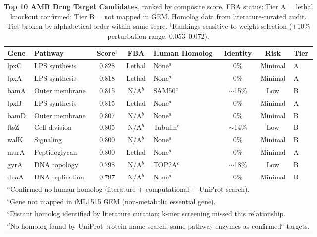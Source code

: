 \documentclass[12pt,a4paper]{article}
\begin{document}
\begin{table}[H]
\centering
\caption{\textbf{Top 10 AMR Drug Target Candidates}, ranked by composite score. FBA status: Tier A = lethal knockout confirmed; Tier B = not mapped in GEM. Homolog data from literature-curated audit. Ties broken by alphabetical order within same score. $^\dagger$Rankings sensitive to weight selection ($\pm$10\% perturbation range: 0.053--0.072).}
\label{tab:targets}
\begin{tabular}{llcclccl}
\toprule
\textbf{Gene} & \textbf{Pathway} & \textbf{Score}$^\dagger$ & \textbf{FBA} & \textbf{Human Homolog} & \textbf{Identity} & \textbf{Risk} & \textbf{Tier} \\
\midrule
lpxC & LPS synthesis & 0.828 & Lethal & None$^a$ & 0\% & Minimal & A \\
lpxA & LPS synthesis & 0.818 & Lethal & None$^d$ & 0\% & Minimal & A \\
bamA & Outer membrane & 0.815 & N/A$^b$ & SAM50$^c$ & $\sim$15\% & Low & B \\
lpxB & LPS synthesis & 0.815 & Lethal & None$^d$ & 0\% & Minimal & A \\
bamD & Outer membrane & 0.807 & N/A$^b$ & None$^d$ & 0\% & Minimal & B \\
ftsZ & Cell division & 0.805 & N/A$^b$ & Tubulin$^c$ & $\sim$14\% & Low & B \\
walK & Signaling & 0.800 & N/A$^b$ & None$^a$ & 0\% & Minimal & B \\
murA & Peptidoglycan & 0.800 & Lethal & None$^a$ & 0\% & Minimal & A \\
gyrA & DNA topology & 0.798 & N/A$^b$ & TOP2A$^c$ & $\sim$18\% & Low & B \\
dnaA & DNA replication & 0.797 & N/A$^b$ & None$^d$ & 0\% & Minimal & B \\
\bottomrule
\multicolumn{8}{l}{\footnotesize $^a$Confirmed no human homolog (literature + computational + UniProt search).} \\
\multicolumn{8}{l}{\footnotesize $^b$Gene not mapped in iML1515 GEM (non-metabolic essential gene).} \\
\multicolumn{8}{l}{\footnotesize $^c$Distant homolog identified by literature curation; k-mer screening missed this relationship.} \\
\multicolumn{8}{l}{\footnotesize $^d$No homolog found by UniProt protein-name search; same pathway enzymes as confirmed$^a$ targets.}
\end{tabular}
\end{table}
\end{document}
